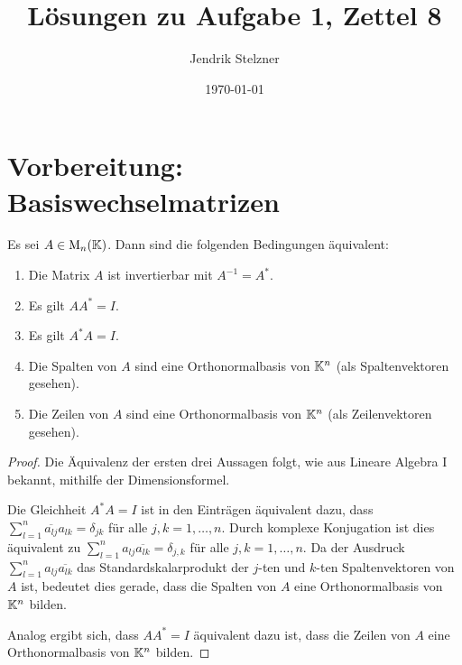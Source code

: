 \documentclass[a4paper, 10pt, numbers=noenddot]{scrartcl}
\title{Lösungen zu Aufgabe 1, Zettel 8}
\author{Jendrik Stelzner}
\date{\today}
\begin{document}
\maketitle



\section{Vorbereitung: Basiswechselmatrizen}


\begin{lemma}
  Es sei $A \in \operatorname{M}_n(\mathbb{K})$.
  Dann sind die folgenden Bedingungen äquivalent:
  \begin{enumerate}
    \item
      Die Matrix $A$ ist invertierbar mit $A^{-1} = A^*$.
    \item
      Es gilt $A A^* = I$.
    \item
      Es gilt $A^* A = I$.
    \item
      Die Spalten von $A$ sind eine Orthonormalbasis von $\mathbb{K}^n$ (als Spaltenvektoren gesehen).
    \item
      Die Zeilen von $A$ sind eine Orthonormalbasis von $\mathbb{K}^n$ (als Zeilenvektoren gesehen).
  \end{enumerate}
\end{lemma}
\begin{proof}
  Die Äquivalenz der ersten drei Aussagen folgt, wie aus Lineare Algebra I bekannt, mithilfe der Dimensionsformel.
  
  Die Gleichheit $A^* A = I$ ist in den Einträgen äquivalent dazu, dass $\sum_{l=1}^n \overline{a_{lj}} a_{lk} = \delta_{jk}$ für alle $j,k = 1, \dotsc, n$.
  Durch komplexe Konjugation ist dies äquivalent zu $\sum_{l=1}^n a_{lj} \overline{a_{lk}} = \delta_{j,k}$ für alle $j, k = 1, \dotsc, n$.
  Da der Ausdruck $\sum_{l=1}^n a_{lj} \overline{a_{lk}}$ das Standardskalarprodukt der $j$-ten und $k$-ten Spaltenvektoren von $A$ ist, bedeutet dies gerade, dass die Spalten von $A$ eine Orthonormalbasis von $\mathbb{K}^n$ bilden.
  
  Analog ergibt sich, dass $A A^* = I$ äquivalent dazu ist, dass die Zeilen von $A$ eine Orthonormalbasis von $\mathbb{K}^n$ bilden.
\end{proof}
\end{document}
